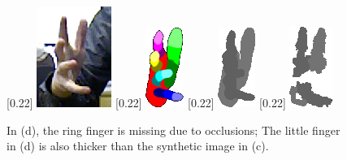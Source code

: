 \begin{figure}[th]
\centering 
{}[0.22\linewidth]{ 
	\includegraphics[height=0.27\linewidth]{fig/hand/fig1_rgb.png}
}
[0.22\linewidth]{ 
	\includegraphics[height=0.25\linewidth]{fig/hand/fig1_a.png}
}
[0.22\linewidth]{ 
	\includegraphics[height=0.25\linewidth]{fig/hand/fig1_c.png}
}
[0.22\linewidth]{ 
	\includegraphics[height=0.25\linewidth]{fig/hand/fig1_b.png} 
}
\caption{In (d), the ring finger is missing due to occlusions; The little finger in (d) is also thicker than the synthetic image in (c).}
\label{fig/hand/intro}
\end{figure}


